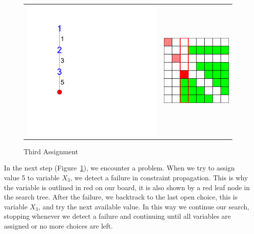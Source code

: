 \begin{figure}[h]
\caption{\label{nqueen:third assignment} Third Assignment}
\begin{center}
\begin{tabular}{cc}
\includegraphics[width=8cm]{../nqueen/full/tree_expanded_4}
&
\includegraphics[width=4cm]{../nqueen/full/frame4}
\end{tabular}
\end{center}
\end{figure}
In the next step (Figure~\ref{nqueen:third assignment}), we encounter a problem. When we try to assign value 5 to variable $X_3$, we detect a failure in constraint propagation. This is why the variable is outlined in red on our board, it is also shown by a red leaf node in the search tree. After the failure, we backtrack to the last open choice, this is variable $X_3$, and try the next available value. In this way we continue our search, stopping whenever we detect a failure and continuing until all variables are assigned or no more choices are left.


